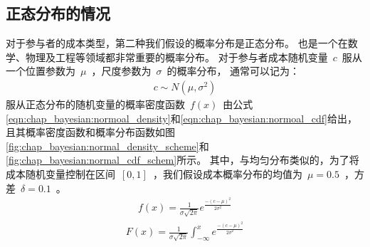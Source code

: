 \subsection{正态分布的情况}
对于参与者的成本类型，第二种我们假设的概率分布是正态分布。
也是一个在数学、物理及工程等领域都非常重要的概率分布。
对于参与者成本随机变量~$c$~服从一个位置参数为~$\mu$~，尺度参数为~$\sigma$~的概率分布，
通常可以记为：
\begin{align*}
    c \sim N(\mu, \sigma^2)
\end{align*}
服从正态分布的随机变量的概率密度函数~$f(x)$~由公式\ref{eqn:chap_bayesian:normoal_density}和\ref{eqn:chap_bayesian:normoal_cdf}给出，
且其概率密度函数和概率分布函数如图\ref{fig:chap_bayesian:normal_density_scheme}和\ref{fig:chap_bayesian:normal_cdf_schem}所示。
其中，与均匀分布类似的，为了将成本随机变量控制在区间~$[0,1]$~，我们假设成本概率分布的均值为~$\mu = 0.5$~，方差~$\delta = 0.1$~。
\begin{align}
    f(x) = \frac{1}{\sigma \sqrt{2\pi} } e^{ \frac{-(c-\mu)^2}{2\sigma^2}}
    \label{eqn:chap_bayesian:normoal_density}
\end{align}
\begin{align}
    F(x) = \frac{1}{\sigma \sqrt{2\pi} } \int^x_{-\infty}e^{ \frac{-(c-\mu)^2}{2\sigma^2}}
    \label{eqn:chap_bayesian:normoal_cdf}
\end{align}
